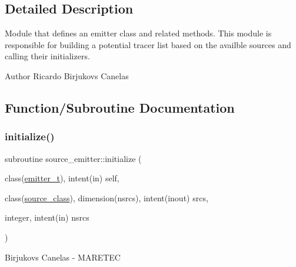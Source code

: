 \subsection{Detailed Description}
Module that defines an emitter class and related methods. This module is responsible for building a potential tracer list based on the availble sources and calling their initializers. 

\begin{DoxyAuthor}{Author}
Ricardo Birjukovs Canelas 
\end{DoxyAuthor}


\subsection{Function/\+Subroutine Documentation}
\mbox{\label{namespacesource__emitter_a18e5a215687e0f5f13c0148be0f0c0e6}} 
\subsubsection{\texorpdfstring{initialize()}{initialize()}}
{\footnotesize\ttfamily subroutine source\+\_\+emitter\+::initialize (\begin{DoxyParamCaption}\item[{class(\mbox{\hyperlink{structsource__emitter_1_1emitter__t}{emitter\+\_\+t}}), intent(in)}]{self,  }\item[{class(\mbox{\hyperlink{structsource__identity_1_1source__class}{source\+\_\+class}}), dimension(nsrcs), intent(inout)}]{srcs,  }\item[{integer, intent(in)}]{nsrcs }\end{DoxyParamCaption})\hspace{0.3cm}{\ttfamily [private]}}



Birjukovs Canelas -\/ M\+A\+R\+E\+T\+EC 

